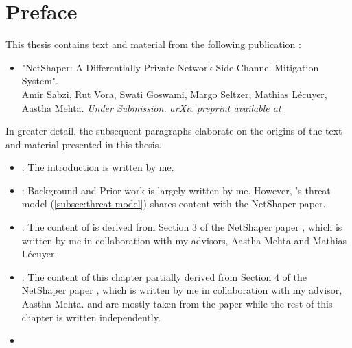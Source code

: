 
\chapter{Preface}

This thesis contains text and material from the following publication \addref:
\begin{itemize}
  \item "NetShaper: A Differentially Private Network Side-Channel Mitigation System".
  \\
  Amir Sabzi, Rut Vora, Swati Goswami, Margo Seltzer, Mathias Lécuyer, Aastha Mehta. \textit{Under Submission. arXiv preprint available at \addref}
\end{itemize}
In greater detail, the subsequent paragraphs elaborate on the origins of the text and material presented in this thesis.
\begin{itemize}
  \item \textbf{}: The introduction is written by me. 
  \item \textbf{}: Background and Prior work is largely written by me. However, {\sys}'s threat model (\ref{subsec:threat-model}) shares content with the NetShaper paper.
  \item \textbf{}: The content of  is derived from Section 3 of the NetShaper paper {\addref}, which is written by me in collaboration with my advisors, Aastha Mehta and Mathias L\'{e}cuyer. 
  \item \textbf{}: The content of this chapter partially derived from Section 4 of the NetShaper paper {\addref}, which is written by me in collaboration with my advisor, Aastha Mehta.  and  are mostly taken from the paper while the rest of this chapter is written independently.
  \item {}
\end{itemize}